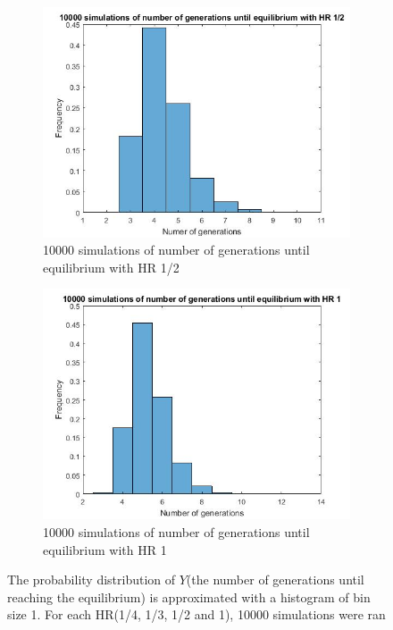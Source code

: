 \documentclass{article}
\begin{document}
\begin{figure}[ht]
\begin{subfigure}[t]{0.4\textwidth}
    \end{subfigure}
    ~ %
    \begin{subfigure}[t]{0.4\textwidth}
        \includegraphics[width=\textwidth]{GenormHistogramAantalgen2}
        \caption{10000 simulations of number of generations until equilibrium with HR 1/2}
        \label{minimal happiness 1}
    \end{subfigure}
    \begin{subfigure}[t]{0.4\textwidth}
        \includegraphics[width=\textwidth]{GenormHistogramAantalgen1}
        \caption{10000 simulations of number of generations until equilibrium with HR 1}
        \label{minimal happiness 1}
    \end{subfigure}
    \caption{The probability distribution of $Y$(the number of generations until reaching the equilibrium) is approximated with a histogram of bin size 1. For each HR(1/4, 1/3, 1/2 and 1), 10000 simulations were ran}
\end{figure}
\end{document}
